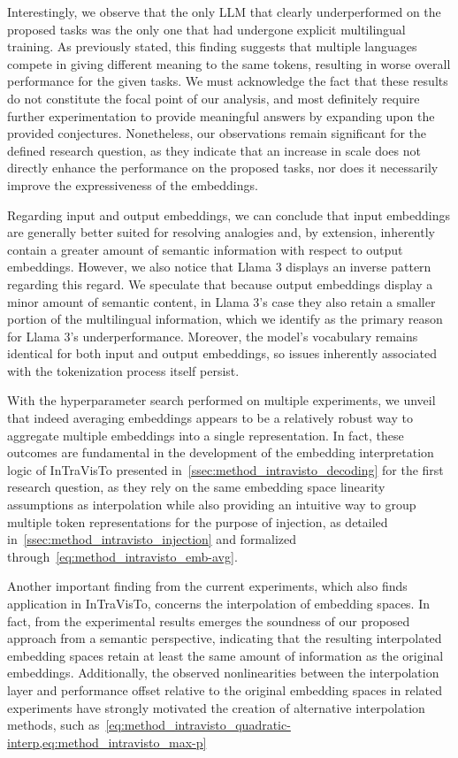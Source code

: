 Interestingly, we observe that the only LLM that clearly underperformed on the proposed tasks was the only one that had undergone explicit multilingual training.
As previously stated, this finding suggests that multiple languages compete in giving different meaning to the same tokens, resulting in worse overall performance for the given tasks.
We must acknowledge the fact that these results do not constitute the focal point of our analysis, and most definitely require further experimentation to provide meaningful answers by expanding upon the provided conjectures.
Nonetheless, our observations remain significant for the defined research question, as they indicate that an increase in scale does not directly enhance the performance on the proposed tasks, nor does it necessarily improve the expressiveness of the embeddings.

Regarding input and output embeddings, we can conclude that input embeddings are generally better suited for resolving analogies and, by extension, inherently contain a greater amount of semantic information with respect to output embeddings.
However, we also notice that Llama 3 displays an inverse pattern regarding this regard.
We speculate that because output embeddings display a minor amount of semantic content, in Llama 3's case they also retain a smaller portion of the multilingual information, which we identify as the primary reason for Llama 3's underperformance.
Moreover, the model's vocabulary remains identical for both  input and output embeddings, so issues inherently associated with the tokenization process itself persist.

With the hyperparameter search performed on multiple experiments, we unveil that indeed averaging embeddings appears to be a relatively robust way to aggregate multiple embeddings into a single representation.
In fact, these outcomes are fundamental in the development of the embedding interpretation logic of InTraVisTo presented in~\cref{ssec:method_intravisto_decoding} for the first research question, as they rely on the same embedding space linearity assumptions as interpolation while also providing an intuitive way to group multiple token representations for the purpose of injection, as detailed in~\cref{ssec:method_intravisto_injection} and formalized through~\cref{eq:method_intravisto_emb-avg}.

Another important finding from the current experiments, which also finds application in InTraVisTo, concerns the interpolation of embedding spaces.
In fact, from the experimental results emerges the soundness of our proposed approach from a semantic perspective, indicating that the resulting interpolated embedding spaces retain at least the same amount of information as the original embeddings.
Additionally, the observed nonlinearities between the interpolation layer and performance offset relative to the original embedding spaces in related experiments have strongly motivated the creation of alternative interpolation methods, such as~\cref{eq:method_intravisto_quadratic-interp,eq:method_intravisto_max-p}

